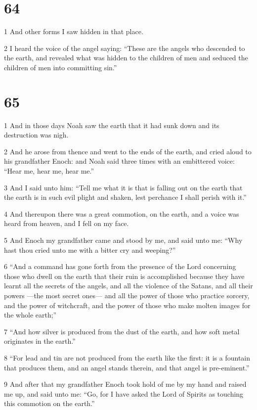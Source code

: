 \chapter{64}

\par 1 And other forms I saw hidden in that place.
\par 2 I heard the voice of the angel saying: “These are the angels who descended to the earth, and revealed what was hidden to the children of men and seduced the children of men into committing sin.”

\chapter{65}

\par 1 And in those days Noah saw the earth that it had sunk down and its destruction was nigh.
\par 2 And he arose from thence and went to the ends of the earth, and cried aloud to his grandfather Enoch: and Noah said three times with an embittered voice: “Hear me, hear me, hear me.”
\par 3 And I said unto him: “Tell me what it is that is falling out on the earth that the earth is in such evil plight and shaken, lest perchance I shall perish with it.”
\par 4 And thereupon there was a great commotion, on the earth, and a voice was heard from heaven, and I fell on my face.
\par 5 And Enoch my grandfather came and stood by me, and said unto me: “Why hast thou cried unto me with a bitter cry and weeping?”
\par 6 “And a command has gone forth from the presence of the Lord concerning those who dwell on the earth that their ruin is accomplished because they have learnt all the secrets of the angels, and all the violence of the Satans, and all their powers —the most secret ones— and all the power of those who practice sorcery, and the power of witchcraft, and the power of those who make molten images for the whole earth;”
\par 7 “And how silver is produced from the dust of the earth, and how soft metal originates in the earth.”
\par 8 “For lead and tin are not produced from the earth like the first: it is a fountain that produces them, and an angel stands therein, and that angel is pre-eminent.”
\par 9 And after that my grandfather Enoch took hold of me by my hand and raised me up, and said unto me: “Go, for I have asked the Lord of Spirits as touching this commotion on the earth.”

